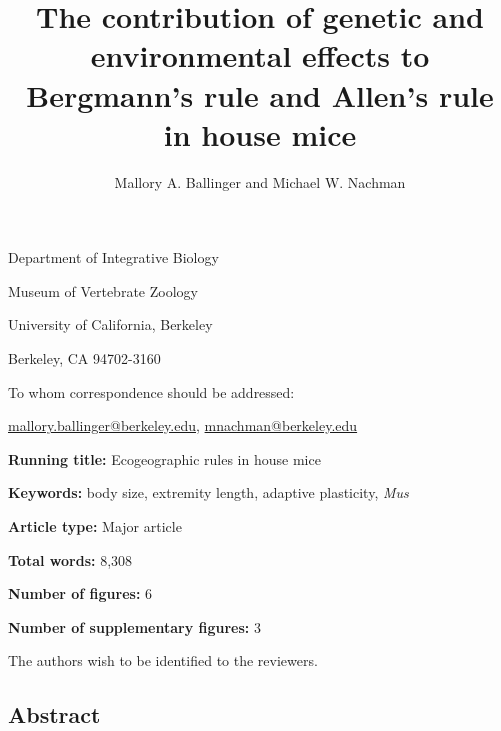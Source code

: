 \documentclass[]{article}
\title{\LARGE{The contribution of genetic and environmental effects to Bergmann’s rule and Allen’s rule in house mice}}
\subtitle{\vspace{10mm}\large{Mallory A. Ballinger and Michael W. Nachman}}
\author{}
\date{\vspace{-2.5em}}
\begin{document}
\maketitle

\vspace{-5mm}

\noindent Department of Integrative Biology

\noindent Museum of Vertebrate Zoology

\noindent University of California, Berkeley

\noindent Berkeley, CA 94702-3160

\vspace{10mm}

\noindent To whom correspondence should be addressed:

\noindent\href{mailto:mallory.ballinger@berkeley.edu}{mallory.ballinger@berkeley.edu},
\noindent\href{mailto:mnachman@berkeley.edu}{mnachman@berkeley.edu}

\vspace{10mm}

\noindent\textbf{Running title:} Ecogeographic rules in house mice

\noindent\textbf{Keywords:} body size, extremity length, adaptive
plasticity, \emph{Mus}

\noindent\textbf{Article type:} Major article

\noindent\textbf{Total words:} 8,308

\noindent\textbf{Number of figures:} 6

\noindent\textbf{Number of supplementary figures:} 3

\vspace{10mm}

\noindent The authors wish to be identified to the reviewers.

\newpage

\hypertarget{abstract}{%
\subsection{Abstract}\label{abstract}}
\end{document}
